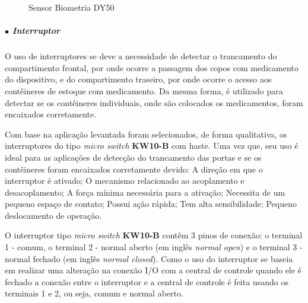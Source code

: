     \begin{figure}[H]
        \centering
        \hspace{0.1\textwidth}
        \caption{Sensor Biometria DY50}\label{fig:sensor_temp_umidade}
    \end{figure}
    
    \subparagraph*{$\bullet$ Interruptor} \hfill
    
    O uso de interruptores se deve a necessidade de detectar o trancamento do compartimento frontal, por onde ocorre a passagem dos copos com medicamento do dispositivo, e do compartimento traseiro, por onde ocorre o acesso aos contêineres de estoque com medicamento. Da mesma forma, é utilizado para detectar se os contêineres individuais, onde são colocados os medicamentos, foram encaixados corretamente.
    
    Com base na aplicação levantada foram selecionados, de forma qualitativa, os interruptores do tipo \textit{micro switch} \textbf{KW10-B} com haste. Uma vez que, seu uso é ideal para as aplicações de detecção do trancamento das portas e se os contêineres foram encaixados corretamente devido: A direção em que o interruptor é ativado; O mecanismo relacionado ao acoplamento e desacoplamento; A força mínima necessária para a ativação; Necessita de um pequeno espaço de contato; Possui ação rápida; Tem alta sensibilidade; Pequeno deslocamento de operação.
    
    O interruptor tipo \textit{micro switch} \textbf{KW10-B} contêm 3 pinos de conexão: o terminal 1 - comum, o terminal 2 - normal aberto (em inglês \textit{normal open}) e o terminal 3 - normal fechado (em inglês \textit{normal closed}). Como o uso do interruptor se baseia em realizar uma alteração na conexão I/O com a central de controle quando ele é fechado a conexão entre o interruptor e a central de controle é feita usando os terminais 1 e 2, ou seja, comum e normal aberto. 
    
